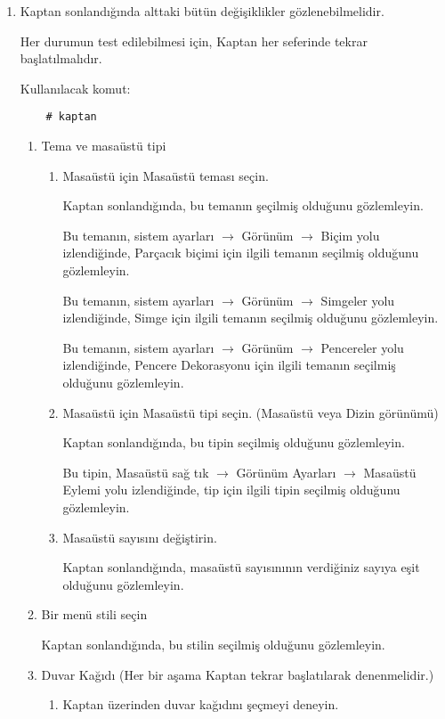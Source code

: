 \documentclass[a4paper,10pt]{article}
\begin{document}
\begin{enumerate}
\item Kaptan sonlandığında alttaki bütün değişiklikler gözlenebilmelidir. 

   Her durumun test edilebilmesi için, Kaptan her seferinde tekrar başlatılmalıdır.

   Kullanılacak komut:
	\begin{verbatim}
	# kaptan
	\end{verbatim}

    \begin{enumerate}
    \item Tema ve masaüstü tipi
        \begin{enumerate}
        \item Masaüstü için Masaüstü teması seçin.

	Kaptan sonlandığında, bu temanın şeçilmiş olduğunu gözlemleyin.
	
	Bu temanın, sistem ayarları $\rightarrow$ Görünüm $\rightarrow$ Biçim yolu izlendiğinde, Parçacık biçimi için ilgili temanın seçilmiş olduğunu gözlemleyin.

	Bu temanın, sistem ayarları $\rightarrow$ Görünüm $\rightarrow$ Simgeler yolu izlendiğinde, Simge için ilgili temanın seçilmiş olduğunu gözlemleyin.

	Bu temanın, sistem ayarları $\rightarrow$ Görünüm $\rightarrow$ Pencereler yolu izlendiğinde, Pencere Dekorasyonu için ilgili temanın seçilmiş olduğunu gözlemleyin.

        \item Masaüstü için Masaüstü tipi seçin. (Masaüstü veya Dizin görünümü)

	Kaptan sonlandığında, bu tipin seçilmiş olduğunu gözlemleyin.

	Bu tipin, Masaüstü sağ tık $\rightarrow$ Görünüm Ayarları $\rightarrow$ Masaüstü Eylemi yolu izlendiğinde, tip için ilgili tipin seçilmiş olduğunu gözlemleyin.

        \item Masaüstü sayısını değiştirin.

	Kaptan sonlandığında, masaüstü sayısınının verdiğiniz sayıya eşit olduğunu gözlemleyin.
        \end{enumerate}

    \item Bir menü stili seçin

        Kaptan sonlandığında, bu stilin seçilmiş olduğunu gözlemleyin.

    \item Duvar Kağıdı (Her bir aşama Kaptan tekrar başlatılarak denenmelidir.)
	\begin{enumerate}
	\item Kaptan üzerinden duvar kağıdını şeçmeyi deneyin.


\end{enumerate}
\end{enumerate}
\end{enumerate}
\end{document}

